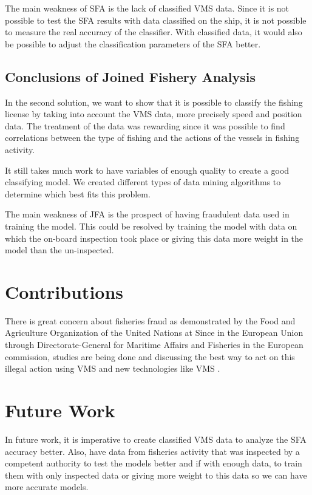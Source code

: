The main weakness of SFA is the lack of classified VMS data. Since it is not possible to test the SFA results with data classified on the ship, it is not possible to measure the real accuracy of the classifier. With classified data, it would also be possible to adjust the classification parameters of the SFA better.


\subsection{Conclusions of Joined Fishery Analysis} %
\label{sub:con_jfa}
In the second solution, we want to show that it is possible to classify the fishing license by taking into account the VMS data, more precisely speed and position data.
The treatment of the data was rewarding since it was possible to find correlations between the type of fishing and the actions of the vessels in fishing activity.

It still takes much work to have variables of enough quality to create a good classifying model.
We created different types of data mining algorithms to determine which best fits this problem.

The main weakness of JFA is the prospect of having fraudulent data used in training the model. This could be resolved by training the model with data on which the on-board inspection took place or giving this data more weight in the model than the un-inspected.



\section{Contributions} %
\label{sub:contributions}


There is great concern about fisheries fraud as demonstrated by the Food and Agriculture Organization of the United Nations at \cite{FAOFraud}
Since in the European Union through Directorate-General for Maritime Affairs and Fisheries in the European commission, studies are being done and discussing the best way to act on this illegal action using VMS and new technologies like VMS \cite{WEBSITE:ECControl}.


\section{Future Work} %
\label{sub:future_work}

In future work, it is imperative to create classified VMS data to analyze the SFA accuracy better. Also, have data from fisheries activity that was inspected by a competent authority to test the models better and if with enough data, to train them with only inspected data or giving more weight to this data so we can have more accurate models.
 







